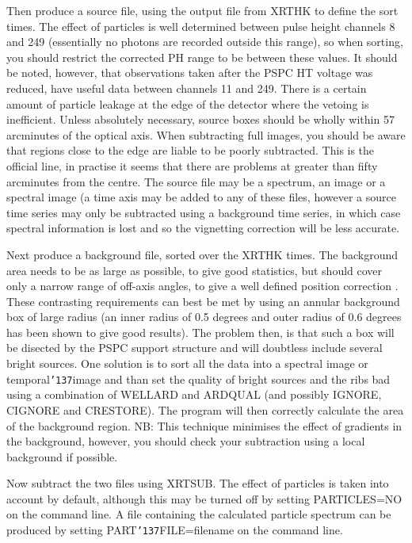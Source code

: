 \documentclass{book}
\renewcommand{\_}{{\tt\char'137}}     %
\begin{document}
Then produce a source file, using the output file from XRTHK to
define the sort times. The effect of particles is well determined
between pulse height channels 8 and 249 (essentially no photons are
recorded outside this range), so when sorting, you should restrict
the corrected PH range to be between these values. It should be
noted, however, that observations taken after the PSPC HT voltage
was reduced, have useful data between channels 11 and 249. There is a
certain amount of particle leakage at the edge of the detector where
the vetoing is inefficient. Unless absolutely necessary, source boxes
should be wholly within 57 arcminutes of the optical axis. When
subtracting full images, you should be aware that regions close to
the edge are liable to be poorly subtracted. This is the official
line, in practise it seems that there are problems at greater than
fifty arcminutes from the centre. The source file may be a spectrum,
an image or a spectral image (a time axis may be added to any of
these files, however a source time series may only be subtracted
using a background time series, in which case spectral information
is lost and so the vignetting correction will be less accurate.
 
Next produce a background file, sorted over the XRTHK times.
The background area needs to be as large as possible, to give
good statistics, but should cover only a narrow range of off-axis
angles, to give a well defined position correction . These
contrasting requirements can best be met by using an annular
background box of large radius (an inner radius of 0.5 degrees and
outer radius of 0.6 degrees has been shown to give good results).
The problem then, is that such a box will be disected
by the PSPC support structure and will doubtless include
several bright sources. One solution is to sort all the data
into a spectral image or temporal\_image and than set the quality of
bright sources and the ribs bad using a combination of WELLARD and
ARDQUAL (and possibly IGNORE, CIGNORE and CRESTORE). The program will
then correctly calculate the area of the background region. NB: This
technique minimises the effect of gradients in the background,
however, you should check your subtraction using a local background
if possible.
 
Now subtract the two files using XRTSUB. The effect of particles is
taken into account by default, although this may be turned off by
setting PARTICLES=NO on the command line. A file containing the
calculated particle spectrum can be produced by setting
PART\_FILE=filename on the command line.
 
\end{document}
